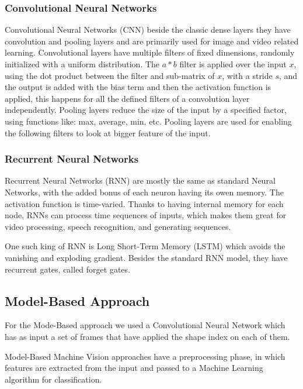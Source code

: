 \documentclass[12pt]{article}
\theoremstyle{definition}
\begin{document}
	\subsubsection{Convolutional Neural Networks}

	Convolutional Neural Networks (CNN) beside the classic dense layers they have convolution and pooling layers and are primarily used for image and video related learning.
	Convolutional layers have multiple filters of fixed dimensions, randomly initialized with a uniform distribution. The $a*b$ filter is applied over the input $x$, using the dot product between the filter and sub-matrix of $x$,  with a stride $s$, and the output is added with the bias term and then the activation function is applied, this happens for all the defined filters of a convolution layer independently. Pooling layers reduce the size of the input by a specified factor, using functions like: max, average, min, etc. Pooling layers are used for enabling the following filters to look at bigger feature of the input.


	\subsubsection{Recurrent Neural Networks}

	Recurrent Neural Networks (RNN) are mostly the same as standard Neural Networks, with the added bonus of each neuron having its owen memory. The activation function is time-varied. Thanks to having internal memory for each node, RNNs can process time sequences of inputs, which makes them great for video processing, speech recognition, and generating sequences.

	One such king of RNN is Long Short-Term Memory (LSTM) which avoids the vanishing and exploding gradient. Besides the standard RNN model, they have recurrent gates, called forget gates.


	\subsection{Model-Based Approach}

	For the Mode-Based approach we used a Convolutional Neural Network which has as input a set of frames that have applied the shape index on each of them.

	Model-Based Machine Vision approaches have a preprocessing phase, in which features are extracted from the input and passed to a Machine Learning algorithm for classification.
\end{document}
